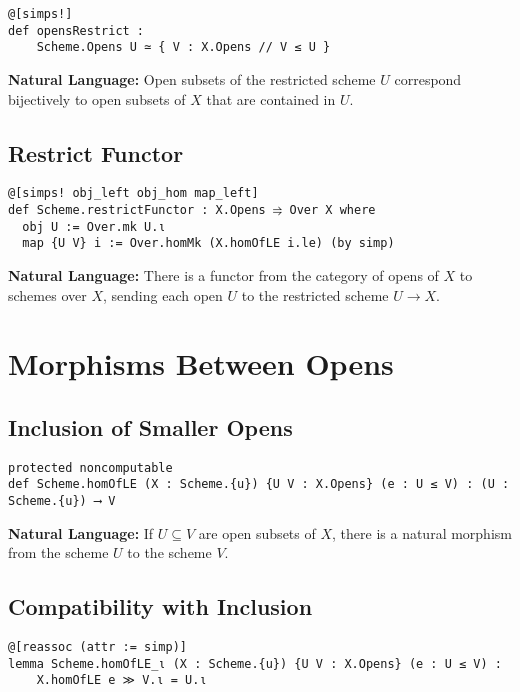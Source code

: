 \documentclass{article}
\theoremstyle{definition}
\begin{document}
\begin{lstlisting}
@[simps!]
def opensRestrict :
    Scheme.Opens U ≃ { V : X.Opens // V ≤ U }
\end{lstlisting}

\textbf{Natural Language:} Open subsets of the restricted scheme $U$ correspond bijectively to open subsets of $X$ that are contained in $U$.

\subsection{Restrict Functor}

\begin{lstlisting}
@[simps! obj_left obj_hom map_left]
def Scheme.restrictFunctor : X.Opens ⥤ Over X where
  obj U := Over.mk U.ι
  map {U V} i := Over.homMk (X.homOfLE i.le) (by simp)
\end{lstlisting}

\textbf{Natural Language:} There is a functor from the category of opens of $X$ to schemes over $X$, sending each open $U$ to the restricted scheme $U \to X$.

\section{Morphisms Between Opens}

\subsection{Inclusion of Smaller Opens}

\begin{lstlisting}
protected noncomputable
def Scheme.homOfLE (X : Scheme.{u}) {U V : X.Opens} (e : U ≤ V) : (U : Scheme.{u}) ⟶ V
\end{lstlisting}

\textbf{Natural Language:} If $U \subseteq V$ are open subsets of $X$, there is a natural morphism from the scheme $U$ to the scheme $V$.

\subsection{Compatibility with Inclusion}

\begin{lstlisting}
@[reassoc (attr := simp)]
lemma Scheme.homOfLE_ι (X : Scheme.{u}) {U V : X.Opens} (e : U ≤ V) :
    X.homOfLE e ≫ V.ι = U.ι
\end{lstlisting}
\end{document}
